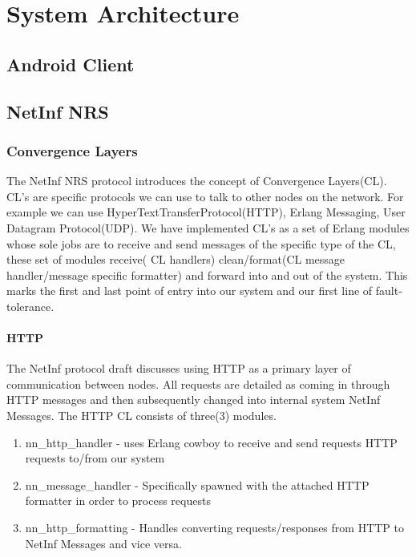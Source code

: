 \documentclass[11pt]{report}
\begin{document}
\chapter{System Architecture}

\section {Android Client}

\section {NetInf NRS}

\subsection {Convergence Layers}

The NetInf NRS protocol introduces the concept of Convergence Layers(CL). CL's are specific protocols we can use to talk to other nodes on the network. For example we can use HyperTextTransferProtocol(HTTP), Erlang Messaging, User Datagram Protocol(UDP). We have implemented CL's as a set of Erlang modules whose sole jobs are to receive and send messages of the specific type of the CL, these set of modules  receive( CL handlers) clean/format(CL message handler/message specific formatter) and forward into and out of the system. This marks the first and last point of entry into our system and our first line of fault-tolerance. 

\subsubsection{HTTP}

The NetInf protocol draft discusses using HTTP as a primary layer of communication between nodes. All requests are detailed as coming in through HTTP messages and then subsequently changed into internal system NetInf Messages. The HTTP CL consists of three(3) modules. 

\begin{enumerate}
\item nn\_http\_handler - uses Erlang cowboy to receive and send requests HTTP requests to/from our system
\item nn\_message\_handler - Specifically spawned with the attached HTTP formatter in order to process requests
\item nn\_http\_formatting - Handles converting requests/responses from HTTP  to NetInf Messages and vice versa.
\end{enumerate}
\end{document}
